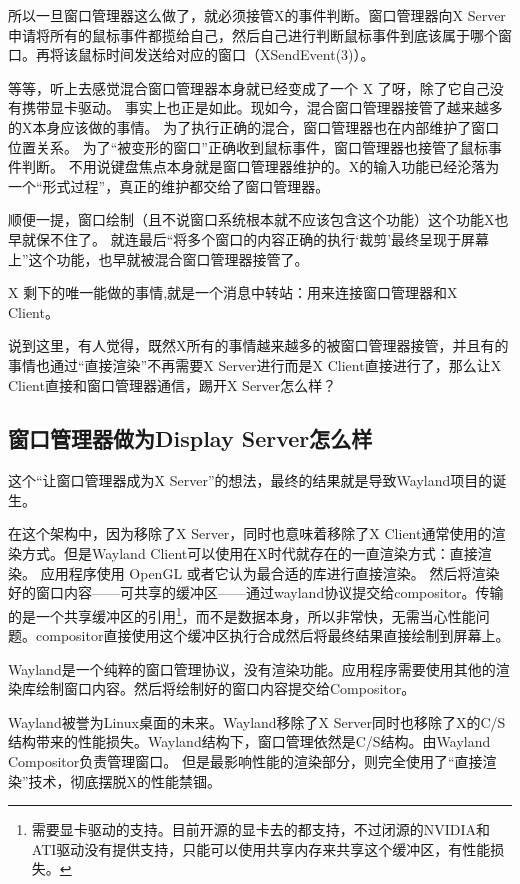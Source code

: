所以一旦窗口管理器这么做了，就必须接管X的事件判断。窗口管理器向X Server申请将所有的鼠标事件都揽给自己，然后自己进行判断鼠标事件到底该属于哪个窗口。再将该鼠标时间发送给对应的窗口（XSendEvent(3)）。

等等，听上去感觉混合窗口管理器本身就已经变成了一个 X 了呀，除了它自己没有携带显卡驱动。
事实上也正是如此。现如今，混合窗口管理器接管了越来越多的X本身应该做的事情。
为了执行正确的混合，窗口管理器也在内部维护了窗口位置关系。
为了“被变形的窗口”正确收到鼠标事件，窗口管理器也接管了鼠标事件判断。
不用说键盘焦点本身就是窗口管理器维护的。X的输入功能已经沦落为一个“形式过程”，真正的维护都交给了窗口管理器。

顺便一提，窗口绘制（且不说窗口系统根本就不应该包含这个功能）这个功能X也早就保不住了。
就连最后“将多个窗口的内容正确的执行‘裁剪’最终呈现于屏幕上”这个功能，也早就被混合窗口管理器接管了。

X 剩下的唯一能做的事情,就是一个消息中转站：用来连接窗口管理器和X Client。

说到这里，有人觉得，既然X所有的事情越来越多的被窗口管理器接管，并且有的事情也通过“直接渲染”不再需要X Server进行而是X Client直接进行了，那么让X Client直接和窗口管理器通信，踢开X Server怎么样？

\subsection{窗口管理器做为Display Server怎么样}

这个“让窗口管理器成为X Server”的想法，最终的结果就是导致Wayland项目的诞生。


在这个架构中，因为移除了X Server，同时也意味着移除了X Client通常使用的渲染方式。但是Wayland Client可以使用在X时代就存在的一直渲染方式：直接渲染。
应用程序使用 OpenGL 或者它认为最合适的库进行直接渲染。
然后将渲染好的窗口内容——可共享的缓冲区——通过wayland协议提交给compositor。传输的是一个共享缓冲区的引用\footnote{需要显卡驱动的支持。目前开源的显卡去的都支持，不过闭源的NVIDIA和ATI驱动没有提供支持，只能可以使用共享内存来共享这个缓冲区，有性能损失。}，而不是数据本身，所以非常快，无需当心性能问题。compositor直接使用这个缓冲区执行合成然后将最终结果直接绘制到屏幕上。

Wayland是一个纯粹的窗口管理协议，没有渲染功能。应用程序需要使用其他的渲染库绘制窗口内容。然后将绘制好的窗口内容提交给Compositor。

Wayland被誉为Linux桌面的未来。Wayland移除了X Server同时也移除了X的C/S结构带来的性能损失。Wayland结构下，窗口管理依然是C/S结构。由Wayland Compositor负责管理窗口。
但是最影响性能的渲染部分，则完全使用了“直接渲染”技术，彻底摆脱X的性能禁锢。

